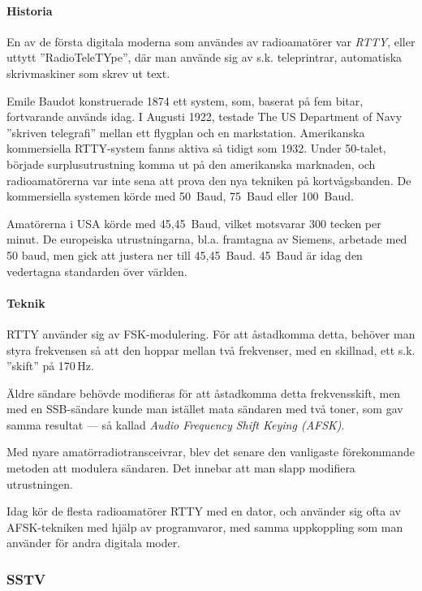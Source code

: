 \paragraph{Historia}

En av de första digitala moderna som användes av radioamatörer var \emph{RTTY},
eller uttytt ''RadioTeleTYpe'', där man använde sig av s.k. teleprintrar,
automatiska skrivmaskiner som skrev ut text.

Emile Baudot konstruerade 1874 ett system, som, baserat på fem bitar,
fortvarande används idag.
I Augusti 1922, testade The US Department of Navy ''skriven telegrafi'' mellan
ett flygplan och en markstation.
Amerikanska kommersiella RTTY-system fanns aktiva så tidigt som 1932.
Under 50-talet, började surplusutrustning komma ut på den amerikanska
marknaden, och radioamatörerna var inte sena att prova den nya tekniken på
kortvågsbanden.
De kommersiella systemen körde med 50~Baud, 75~Baud eller 100~Baud.

Amatörerna i USA körde med 45,45~Baud, vilket motsvarar 300 tecken per minut.
De europeiska utrustningarna, bl.a. framtagna av Siemens, arbetade med 50 baud,
men gick att justera ner till 45,45~Baud.
45~Baud är idag den vedertagna standarden över världen.

\paragraph{Teknik}

RTTY använder sig av FSK-modulering.
För att åstadkomma detta, behöver man styra frekvensen så att den hoppar mellan
två frekvenser, med en skillnad, ett s.k. ''skift'' på 170\,Hz.

Äldre sändare behövde modifieras för att åstadkomma detta frekvensskift, men
med en SSB-sändare kunde man istället mata sändaren med två toner, som gav
samma resultat --- så kallad \emph{Audio Frequency Shift Keying (AFSK)}.

Med nyare amatörradiotransceivrar, blev det senare den vanligaste förekommande
metoden att modulera sändaren.
Det innebar att man slapp modifiera utrustningen.

Idag kör de flesta radioamatörer RTTY med en dator, och använder sig ofta av
AFSK-tekniken med hjälp av programvaror, med samma uppkoppling som man använder
för andra digitala moder.

\subsubsection{SSTV}

